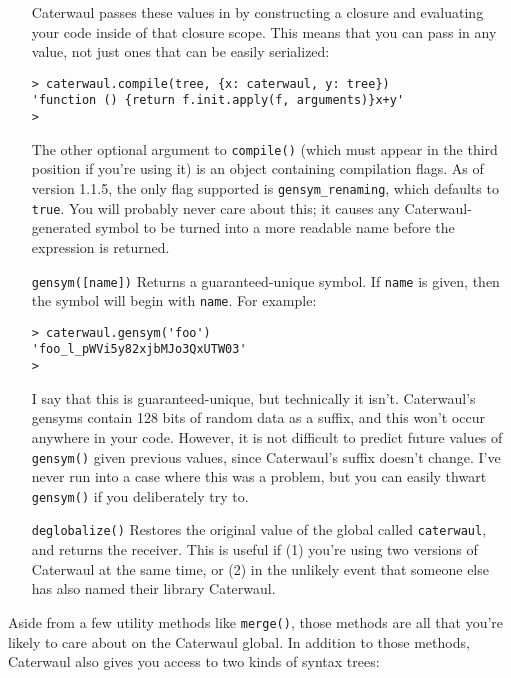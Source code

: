 \documentclass{report}
\begin{document}
\begin{enumerate}
  Caterwaul passes these values in by constructing a closure and evaluating your code inside of that closure scope. This means that you can pass in any value, not just ones that can be
  easily serialized:

\begin{verbatim}
> caterwaul.compile(tree, {x: caterwaul, y: tree})
'function () {return f.init.apply(f, arguments)}x+y'
>
\end{verbatim}

  The other optional argument to {\tt compile()} (which must appear in the third position if you're using it) is an object containing compilation flags. As of version 1.1.5, the only flag
  supported is \verb|gensym_renaming|, which defaults to {\tt true}. You will probably never care about this; it causes any Caterwaul-generated symbol to be turned into a more readable
  name before the expression is returned.

\item[{\tt gensym([name])}]
  Returns a guaranteed-unique symbol. If {\tt name} is given, then the symbol will begin with {\tt name}. For example:

\begin{verbatim}
> caterwaul.gensym('foo')
'foo_l_pWVi5y82xjbMJo3QxUTW03'
>
\end{verbatim}

  I say that this is guaranteed-unique, but technically it isn't. Caterwaul's gensyms contain 128 bits of random data as a suffix, and this won't occur anywhere in your code. However, it
  is not difficult to predict future values of {\tt gensym()} given previous values, since Caterwaul's suffix doesn't change. I've never run into a case where this was a problem, but you
  can easily thwart {\tt gensym()} if you deliberately try to.

\item[{\tt deglobalize()}]
  Restores the original value of the global called {\tt caterwaul}, and returns the receiver. This is useful if (1) you're using two versions of Caterwaul at the same time, or (2) in the
  unlikely event that someone else has also named their library Caterwaul.
\end{enumerate}

  Aside from a few utility methods like {\tt merge()}, those methods are all that you're likely to care about on the Caterwaul global. In addition to those methods, Caterwaul also gives you
  access to two kinds of syntax trees:
\end{document}
